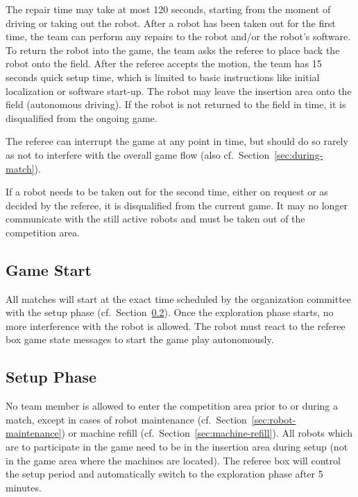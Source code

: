 \documentclass[12pt,twoside]{article}
\newcommand{\refsec}[1]{Section~\ref{#1}}
\begin{document}
The repair time may take at most 120 seconds, starting from the moment
of driving or taking out the robot.  After a robot has been taken out
for the first time, the team can perform any repairs to the robot
and/or the robot's software. To return the robot into the game, the
team asks the referee to place back the robot onto the field. After
the referee accepts the motion, the team has 15 seconds quick setup
time, which is limited to basic instructions like initial localization
or software start-up. The robot may leave the insertion area onto the
field (autonomous driving). If the robot is not returned to the field
in time, it is disqualified from the ongoing game.

The referee can interrupt the game at any point in time, but should do
so rarely as not to interfere with the overall game flow (also
cf.~\refsec{sec:during-match}).

If a robot needs to be taken out for the second time, either on
request or as decided by the referee, it is disqualified from the
current game. It may no longer communicate with the still active
robots and must be taken out of the competition area.


\subsection{Game Start}
\label{sec:game-start}
%
All matches will start at the exact time scheduled by the organization
committee with the setup phase (cf.~\refsec{sec:setup-phase}). Once
the exploration phase starts, no more interference with the robot is
allowed. The robot must react to the referee box game state messages
to start the game play autonomously.

\subsection{Setup Phase}
\label{sec:setup-phase}
No team member is allowed to enter the competition area prior to or
during a match, except in cases of robot maintenance
(cf.~\refsec{sec:robot-maintenance}) or machine refill
(cf.~\refsec{sec:machine-refill}).  All robots which are to
participate in the game need to be in the insertion area during setup
(not in the game area where the machines are located). The referee box
will control the setup period and automatically switch to the
exploration phase after 5 minutes.
\end{document}
